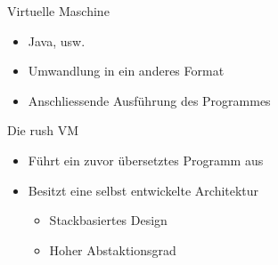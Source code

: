 \begin{frame}{Virtuelle Maschine}
	\begin{itemize}
		\item Java, usw.
		\item Umwandlung in ein anderes Format
		\item[\Rightarrow] Anschliessende Ausführung des Programmes
	\end{itemize}
\end{frame}

\begin{frame}{Die rush VM}
	\begin{itemize}
		\item<1-> Führt ein zuvor übersetztes Programm aus
		\item<2-> Besitzt eine selbst entwickelte Architektur
		      \begin{itemize}
			      \item Stackbasiertes Design
			      \item Hoher Abstaktionsgrad
		      \end{itemize}
	\end{itemize}
\end{frame}

